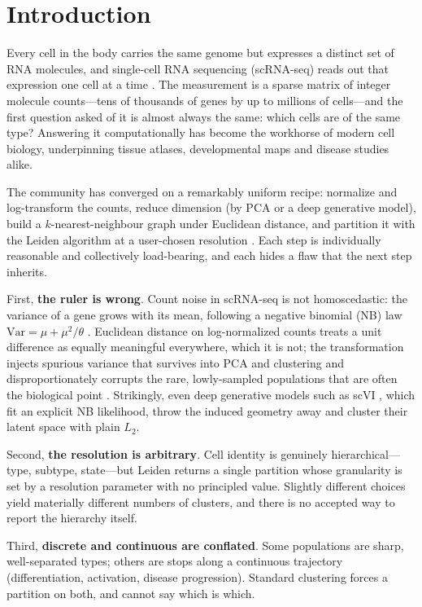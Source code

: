 \documentclass[11pt]{article}
\begin{document}
\section{Introduction}
Every cell in the body carries the same genome but expresses a distinct set of RNA molecules,
and single-cell RNA sequencing (scRNA-seq) reads out that expression one cell at a time
\citep{macosko2015highly}. The measurement is a sparse matrix of integer molecule counts---tens
of thousands of genes by up to millions of cells---and the first question asked of it is almost
always the same: which cells are of the same type? Answering it computationally has become the
workhorse of modern cell biology, underpinning tissue atlases, developmental maps and disease
studies alike.

The community has converged on a remarkably uniform recipe: normalize and log-transform the
counts, reduce dimension (by PCA or a deep generative model), build a $k$-nearest-neighbour
graph under Euclidean distance, and partition it with the Leiden algorithm at a user-chosen
resolution \citep{traag2019leiden,wolf2018scanpy}. Each step is individually reasonable and
collectively load-bearing, and each hides a flaw that the next step inherits.

First, \textbf{the ruler is wrong}. Count noise in scRNA-seq is not homoscedastic: the variance
of a gene grows with its mean, following a negative binomial (NB) law $\mathrm{Var}=\mu+\mu^2/\theta$
\citep{svensson2020droplet,townes2019glmpca}. Euclidean distance on log-normalized counts treats a
unit difference as equally meaningful everywhere, which it is not; the transformation injects
spurious variance that survives into PCA and clustering and disproportionately corrupts the rare,
lowly-sampled populations that are often the biological point \citep{townes2019glmpca,ahlmann2023comparison}.
Strikingly, even deep generative models such as scVI \citep{lopez2018scvi}, which fit an explicit NB
likelihood, throw the induced geometry away and cluster their latent space with plain $L_2$.

Second, \textbf{the resolution is arbitrary}. Cell identity is genuinely hierarchical---type,
subtype, state---but Leiden returns a single partition whose granularity is set by a resolution
parameter with no principled value. Slightly different choices yield materially different numbers
of clusters, and there is no accepted way to report the hierarchy itself.

Third, \textbf{discrete and continuous are conflated}. Some populations are sharp, well-separated
types; others are stops along a continuous trajectory (differentiation, activation, disease
progression). Standard clustering forces a partition on both, and cannot say which is which.
\end{document}
